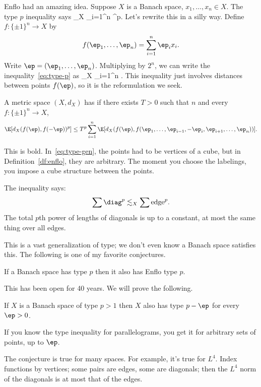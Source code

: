 Enflo had an amazing idea. 
Suppose $X$ is a Banach space, $x_1,\ldots, x_n\in X$. The type $p$ inequality  says 
\E{} \lesssim_X \sum_{i=1}^n ^p.
\eeq
Let's rewrite this in a silly way. Define $f:\{\pm 1\}^n\to X$ by
\[
f(\ep_1,\ldots, \ep_n)=\sum_{i=1}^n \ep_i x_i.
\]
Write $\ep=(\ep_1,\ldots, \ep_n)$. Multiplying by $2^n$, we can write the inequality~\eqref{eq:type-p} as
\E{}\lesssim_X
\sum_{i=1}^n \E{}.
\eeq
This inequality just involves distances between points $f(\ep)$, so it is the reformulation we seek.

\begin{df}
A metric space $(X,d_X)$ has  if there exists $T>0$ such that $n$ and every $f:\{\pm 1\}^n\to X$,
\[
\E[d_X(f(\ep), f(-\ep))^p]\le T^p \sum_{i=1}^n \E[ d_X(f(\ep), f(\ep_1,\ldots, \ep_{i-1}, -\ep_i, \ep_{i+1},\ldots, \ep_n))].
\]
\end{df}
This is bold. 
In~\eqref{eq:type-gen}, the points had to be vertices of a cube, but in Definition~\ref{df:enflo}, they are arbitrary. The moment you choose the labelings, you impose a cube structure between the points. %


The inequality says:
\[
\sum \diag^p\lesssim_X\sum \text{edge}^p.
\]
The total $p$th power of lengths of diagonals is up to a constant, at most the same thing over all edges.

This is a vast generalization of type; we don't even know a Banach space satisfies this.
The following is one of my favorite conjectures.
\begin{conj}[Enflo]
If a Banach space has type $p$ then it also has Enflo type $p$.
\end{conj}
This has been open for 40 years. We will prove the following.
\begin{thm}
If $X$ is a Banach space of type $p>1$ then $X$ also has type $p-\ep$ for every $\ep>0$.
\end{thm}
If you know the type inequality for parallelograms, you get it for arbitrary sets of points, up to $\ep$.

The conjecture is true for many spaces. For example, it's true for $L^4$. Index functions by vertices; some pairs are edges, some are diagonals; then the $L^4$ norm of the diagonals is at most that of the edges.

